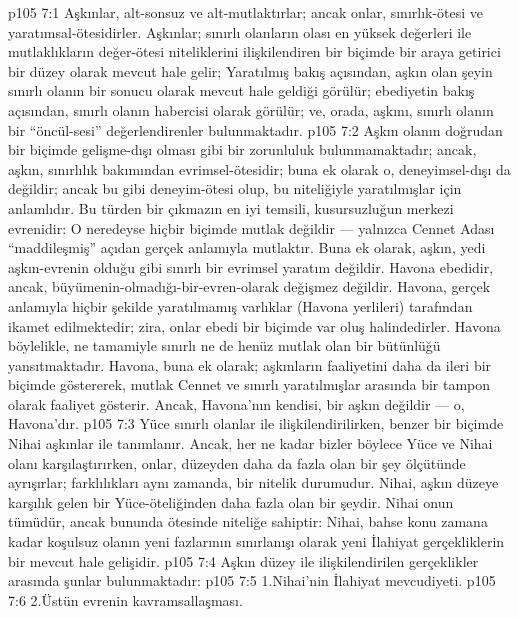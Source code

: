 \vs p105 7:1 Aşkınlar, alt\hyp{}sonsuz ve alt\hyp{}mutlaktırlar; ancak onlar, sınırlık\hyp{}ötesi ve yaratımsal\hyp{}ötesidirler. Aşkınlar; sınırlı olanların olası en yüksek değerleri ile mutlaklıkların değer\hyp{}ötesi niteliklerini ilişkilendiren bir biçimde bir araya getirici bir düzey olarak mevcut hale gelir; Yaratılmış bakış açısından, aşkın olan şeyin sınırlı olanın bir sonucu olarak mevcut hale geldiği görülür; ebediyetin bakış açısından, sınırlı olanın habercisi olarak görülür; ve, orada, aşkını, sınırlı olanın bir “öncül\hyp{}sesi” değerlendirenler bulunmaktadır.
\vs p105 7:2 Aşkın olanın doğrudan bir biçimde gelişme\hyp{}dışı olması gibi bir zorunluluk bulunmamaktadır; ancak, aşkın, sınırlılık bakımından evrimsel\hyp{}ötesidir; buna ek olarak o, deneyimsel\hyp{}dışı da değildir; ancak bu gibi deneyim\hyp{}ötesi olup, bu niteliğiyle yaratılmışlar için anlamlıdır. Bu türden bir çıkmazın en iyi temsili, kusursuzluğun merkezi evrenidir: O neredeyse hiçbir biçimde mutlak değildir --- yalnızca Cennet Adası “maddileşmiş” açıdan gerçek anlamıyla mutlaktır. Buna ek olarak, aşkın, yedi aşkın\hyp{}evrenin olduğu gibi sınırlı bir evrimsel yaratım değildir. Havona ebedidir, ancak, büyümenin\hyp{}olmadığı\hyp{}bir\hyp{}evren\hyp{}olarak değişmez değildir. Havona, gerçek anlamıyla hiçbir şekilde yaratılmamış varlıklar (Havona yerlileri) tarafından ikamet edilmektedir; zira, onlar ebedi bir biçimde var oluş halindedirler. Havona böylelikle, ne tamamiyle sınırlı ne de henüz mutlak olan bir bütünlüğü yansıtmaktadır. Havona, buna ek olarak; aşkınların faaliyetini daha da ileri bir biçimde göstererek, mutlak Cennet ve sınırlı yaratılmışlar arasında bir tampon olarak faaliyet gösterir. Ancak, Havona’nın kendisi, bir aşkın değildir --- o, Havona’dır.
\vs p105 7:3 Yüce sınırlı olanlar ile ilişkilendirilirken, benzer bir biçimde Nihai aşkınlar ile tanımlanır. Ancak, her ne kadar bizler böylece Yüce ve Nihai olanı karşılaştırırken, onlar, düzeyden daha da fazla olan bir şey ölçütünde ayrışırlar; farklılıkları aynı zamanda, bir nitelik durumudur. Nihai, aşkın düzeye karşılık gelen bir Yüce\hyp{}öteliğinden daha fazla olan bir şeydir. Nihai onun tümüdür, ancak bununda ötesinde niteliğe sahiptir: Nihai, bahse konu zamana kadar koşulsuz olanın yeni fazlarının sınırlanışı olarak yeni İlahiyat gerçekliklerin bir mevcut hale gelişidir.
\vs p105 7:4 Aşkın düzey ile ilişkilendirilen gerçeklikler arasında şunlar bulunmaktadır:
\vs p105 7:5 1.\bibnobreakspace Nihai’nin İlahiyat mevcudiyeti.
\vs p105 7:6 2.\bibnobreakspace Üstün evrenin kavramsallaşması.
